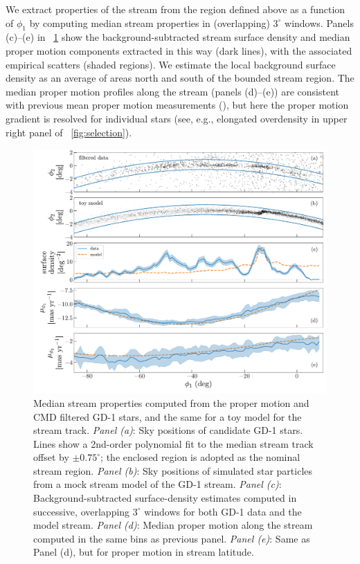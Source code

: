 \documentclass[modern]{aastex62}
\begin{document}
We extract properties of the stream from the region defined above as a function
of $\phi_1$ by computing median stream properties in (overlapping) $3^\circ$ windows.
Panels (c)--(e) in \figurename~\ref{fig:track-and-model} show the
background-subtracted stream surface density and median proper motion components
extracted in this way (dark lines), with the associated empirical scatters
(shaded regions).
We estimate the local background surface density as an average of areas north
and south of the bounded stream region.
The median proper motion profiles along the stream (panels (d)--(e)) are
consistent with previous mean proper motion measurements
(\citealt{Koposov:2010}), but here the proper motion gradient is resolved for
individual stars (see, e.g., elongated overdensity in upper right panel of
\figurename~\ref{fig:selection}).

\begin{figure}
\begin{center}
\includegraphics[width=\textwidth]{track_observables.pdf}
\end{center}
\caption{%
Median stream properties computed from the proper motion and CMD filtered GD-1
stars, and the same for a toy model for the stream track.
\textit{Panel (a)}: Sky positions of candidate GD-1 stars.
Lines show a 2nd-order polynomial fit to the median stream track offset by $\pm
0.75^\circ$; the enclosed region is adopted as the nominal stream region.
\textit{Panel (b)}: Sky positions of simulated star particles from a mock stream
model of the GD-1 stream.
\textit{Panel (c)}: Background-subtracted surface-density estimates computed in
successive, overlapping $3^\circ$ windows for both GD-1 data and the model
stream.
\textit{Panel (d)}: Median proper motion along the stream computed in the same
bins as previous panel.
\textit{Panel (e)}: Same as Panel (d), but for proper motion in stream latitude.
}
\label{fig:track-and-model}
\end{figure}
\end{document}
